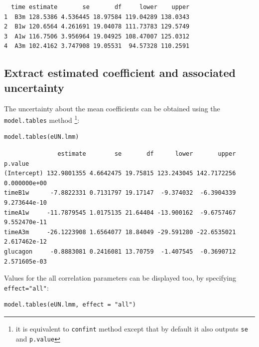 \documentclass[12pt]{article}
\begin{document}
\begin{verbatim}
  time estimate       se       df     lower    upper
1  B3m 128.5386 4.536445 18.97584 119.04289 138.0343
2  B1w 120.6564 4.261691 19.04078 111.73783 129.5749
3  A1w 116.7506 3.956964 19.04925 108.47007 125.0312
4  A3m 102.4162 3.747908 19.05531  94.57328 110.2591
\end{verbatim}

\subsection{Extract estimated coefficient and associated uncertainty}
\label{sec:org34648d6}

The uncertainty about the mean coefficients can be obtained using the
\texttt{model.tables} method \footnote{it is equivalent to \texttt{confint} method
except that by default it also outputs \texttt{se} and \texttt{p.value}}:
\lstset{language=r,label= ,caption= ,captionpos=b,numbers=none}
\begin{lstlisting}
model.tables(eUN.lmm)
\end{lstlisting}

\begin{verbatim}
               estimate        se       df      lower       upper      p.value
(Intercept) 132.9801355 4.6642475 19.75815 123.243045 142.7172256 0.000000e+00
timeB1w      -7.8822331 0.7131797 19.17147  -9.374032  -6.3904339 9.273644e-10
timeA1w     -11.7879545 1.0175135 21.64404 -13.900162  -9.6757467 9.552470e-11
timeA3m     -26.1223908 1.6564077 18.84049 -29.591280 -22.6535021 2.617462e-12
glucagon     -0.8883081 0.2416081 13.70759  -1.407545  -0.3690712 2.571605e-03
\end{verbatim}


Values for the all correlation parameters can be displayed
too, by specifying \texttt{effect="all"}:
\lstset{language=r,label= ,caption= ,captionpos=b,numbers=none}
\begin{lstlisting}
model.tables(eUN.lmm, effect = "all")
\end{lstlisting}
\end{document}
